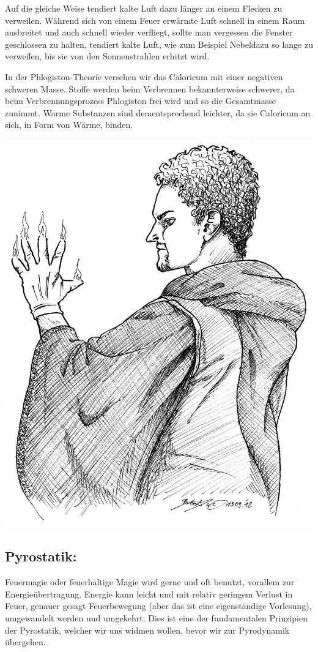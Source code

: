 \documentclass[a5paper,8pt]{book}
\begin{document}
Auf die gleiche Weise tendiert kalte Luft dazu länger an einem Flecken zu verweilen. Während sich von einem Feuer erwärmte 
Luft schnell in einem Raum ausbreitet und auch schnell wieder verfliegt, sollte man vergessen die Fenster geschlossen 
zu halten, tendiert kalte Luft, wie zum Beispiel Nebel\footnotemark[2] dazu so lange zu verweilen, bis sie von den Sonnenstrahlen 
erhitzt wird\footnotemark[3].

In der Phlogiston-Theorie versehen wir das Caloricum mit einer negativen schweren Masse. Stoffe werden beim Verbrennen 
bekannterweise schwerer, da beim Verbrennungsprozess Phlogiston frei wird und so die Gesamtmasse zunimmt. Warme Substanzen 
sind dementsprechend leichter, da sie Caloricum an sich, in Form von Wärme, binden.

\newpage

\begin{center}
\includegraphics[width=\textwidth]{pictures/flofeuerform1.jpg}
\end{center}

\subsection{Pyrostatik:}
Feuermagie oder feuerhaltige Magie wird gerne und oft benutzt, vorallem zur Energieübertragung. Energie kann leicht und mit 
relativ geringem Verlust in Feuer, genauer gesagt Feuerbewegung (aber das ist eine eigenständige Vorlesung), umgewandelt 
werden und umgekehrt. Dies ist eine der fundamentalen Prinzipien der Pyrostatik, welcher wir uns widmen wollen, bevor wir 
zur Pyrodynamik übergehen.
\end{document}
